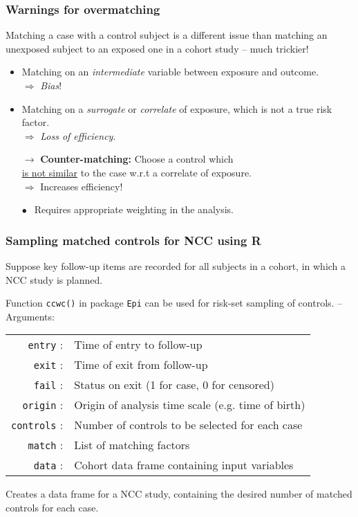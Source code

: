 \documentclass[12pt,dvipsnames,t,handout%
,aspectratio=169%
]{beamer}
\begin{document}
\begin{frame}
\frametitle{Warnings for overmatching}

\pause

Matching a case with a control subject is a different issue than matching 
an unexposed subject to an exposed one in a cohort study  --  much trickier! 
\pause
\begin{itemize}
\item Matching on an {\it intermediate} variable between
	exposure  and outcome. \\  	
	\pause\medskip
	$\Rightarrow$ {\it Bias}! %
\pause\medskip
\item Matching on a {\it surrogate} or 
{\it correlate} of exposure, which is not a
	true risk factor. \\ %
	$\Rightarrow$ {\it Loss of efficiency}. 
	\pause\medskip
\item[$\rightarrow$] {\bf Counter-matching:} \pause
 Choose a control which \\
    \underline{is not
	similar} to the case w.r.t a correlate of exposure. 
	\\	
	\medskip
	$\Rightarrow$ Increases efficiency!
	
	\medskip
	$\bullet \ \ $ Requires appropriate weighting in the analysis.
\end{itemize}
\end{frame} 

\begin{frame}
\frametitle{Sampling matched controls for NCC using R}

\pause
\bi
\item
Suppose key follow-up items are recorded
for all subjects in a cohort, in which a NCC study
is planned.
\pause
\medskip
\item
Function {\tt ccwc()} in package {\tt Epi} can be used for risk-set sampling
of controls. -- Arguments:
\ei
\pause
\begin{tabular}{r l}
{\tt entry} : & Time of entry to follow-up\\  
{\tt exit} : & Time of exit from follow-up \\ 
{\tt fail} : & Status on exit (1 for case, 0 for censored) \\ 
{\tt origin} : & Origin of analysis time scale (e.g. time of birth)\\ 
{\tt controls} : & Number of controls to be selected for each case \\ 
{\tt match} : & List of matching factors\\
{\tt data} : & Cohort data frame containing input variables 
\end{tabular}
\pause 
\bi
\item Creates a data frame for a NCC study,
containing the desired number of matched controls
for each case.
\ei

\end{frame}
\end{document}
